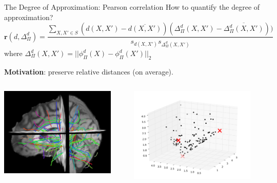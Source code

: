 \documentclass{beamer}
\begin{document}
\begin{frame}{The Degree of Approximation: Pearson correlation}
  How to quantify the degree of approximation?
  \begin{equation*}
    \mathbf{r}(d,\Delta_{\Pi}^d) = \frac{\sum_{X,X' \in S} (d(X,X') -
      \overline{d(X,X')}) (\Delta_{\Pi}^d(X,X') -
      \overline{\Delta_{\Pi}^d(X,X')}) )}{s_{d(X,X')} s_{\Delta_{\Pi}^d(X,X')}}
  \end{equation*}
  where $\Delta_{\Pi}^d(X, X') = || \phi_{\Pi}^d(X) - \phi_{\Pi}^d(X')
  ||_2$
  \begin{center}
    \textbf{Motivation}: preserve relative distances (on average).
  \end{center}
  \begin{columns}
    \begin{column}{0.5\linewidth}
      \includegraphics[width=5.5cm]{prni2012b}
    \end{column}
    \begin{column}{0.5\linewidth}
      \includegraphics[width=6cm]{example_2d_dissimilarity}
    \end{column}
  \end{columns}
\end{frame}
\end{document}
